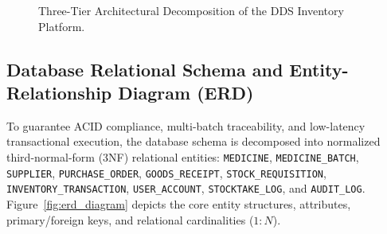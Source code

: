 \begin{figure}[htbp]
\caption{Three-Tier Architectural Decomposition of the DDS Inventory Platform.}
\label{fig:sys_arch}
\end{figure}

\subsection{Database Relational Schema and Entity-Relationship Diagram (ERD)}
To guarantee ACID compliance, multi-batch traceability, and low-latency transactional execution, the database schema is decomposed into normalized third-normal-form (3NF) relational entities: \texttt{MEDICINE}, \texttt{MEDICINE\_BATCH}, \texttt{SUPPLIER}, \texttt{PURCHASE\_ORDER}, \texttt{GOODS\_RECEIPT}, \texttt{STOCK\_REQUISITION}, \texttt{INVENTORY\_TRANSACTION}, \texttt{USER\_ACCOUNT}, \texttt{STOCKTAKE\_LOG}, and \texttt{AUDIT\_LOG}. Figure~\ref{fig:erd_diagram} depicts the core entity structures, attributes, primary/foreign keys, and relational cardinalities ($1:N$).

